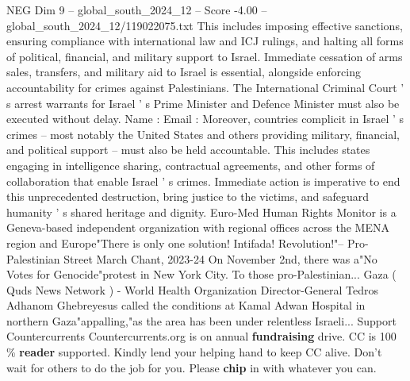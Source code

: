 \begin{textsample}{NEG Dim 9 – global\_south\_2024\_12 – Score -4.00 – global\_south\_2024\_12/119022075.txt}
This includes imposing effective sanctions, ensuring compliance with international law and ICJ rulings, and halting all forms of political, financial, and military support to Israel.
Immediate cessation of arms sales, transfers, and military aid to Israel is essential, alongside enforcing accountability for crimes against Palestinians.
The International Criminal Court ' s arrest warrants for Israel ' s Prime Minister and Defence Minister must also be executed without delay.
Name : Email : Moreover, countries complicit in Israel ' s crimes -- most notably the United States and others providing military, financial, and political support -- must also be held accountable.
This includes states engaging in intelligence sharing, contractual agreements, and other forms of collaboration that enable Israel ' s crimes.
Immediate action is imperative to end this unprecedented destruction, bring justice to the victims, and safeguard humanity ' s shared heritage and dignity.
Euro-Med Human Rights Monitor is a Geneva-based independent organization with regional offices across the MENA region and Europe"There is only one solution!
Intifada!
Revolution!"-- Pro-Palestinian Street March Chant, 2023-24 On November 2nd, there was a"No Votes for Genocide"protest in New York City.
To those pro-Palestinian...
Gaza ( Quds News Network ) - World Health Organization Director-General Tedros Adhanom Ghebreyesus called the conditions at Kamal Adwan Hospital in northern Gaza"appalling,"as the area has been under relentless Israeli...
Support Countercurrents Countercurrents.org is on annual \textbf{fundraising} drive.
CC is 100 \% \textbf{reader} supported.
Kindly lend your helping hand to keep CC alive.
Don't wait for others to do the job for you.
Please \textbf{chip} in with whatever you can.

\end{textsample}
